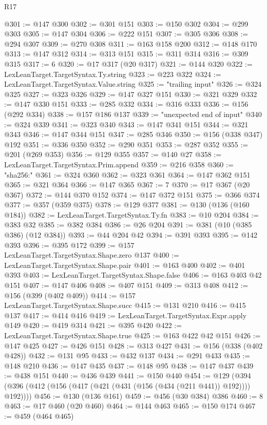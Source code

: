 \begin{lexlean}{R17}
\begin{coremodule}
@301 := @147 @300
@302 := @301 @151
@303 := @150 @302
@304 := @299 @303
@305 := @147 @304
@306 := @222 @151
@307 := @305 @306
@308 := @294 @307
@309 := @270 @308
@311 := @163 @158 @200
@312 := @148 @170
@313 := @147 @312
@314 := @313 @151
@315 := @311 @314
@316 := @309 @315
@317 := 6
@320 := @17 @317 (@20 @317)
@321 := @144 @320
@322 := LexLeanTarget.TargetSyntax.Ty.string
@323 := @223 @322
@324 := LexLeanTarget.TargetSyntax.Value.string
@325 := "trailing input"
@326 := @324 @325
@327 := @323 @326
@329 := @147 @327 @151
@330 := @321 @329
@332 := @147 @330 @151
@333 := @285 @332
@334 := @316 @333
@336 := @156 (@292 @334)
@338 := @157 @186 @137
@339 := "unexpected end of input"
@340 := @324 @339
@341 := @323 @340
@343 := @147 @341 @151
@344 := @321 @343
@346 := @147 @344 @151
@347 := @285 @346
@350 := @156 (@338 @347) @192
@351 := @336 @350
@352 := @290 @351
@353 := @287 @352
@355 := @201 (@269 @353)
@356 := @129 @355
@357 := @140 @27
@358 := LexLeanTarget.TargetSyntax.Prim.append
@359 := @216 @358
@360 := "sha256:"
@361 := @324 @360
@362 := @323 @361
@364 := @147 @362 @151
@365 := @321 @364
@366 := @147 @365
@367 := 7
@370 := @17 @367 (@20 @367)
@372 := @144 @370 @152
@374 := @147 @372 @151
@375 := @366 @374
@377 := @357 (@359 @375)
@378 := @129 @377
@381 := @130 (@136 (@160 @184))
@382 := LexLeanTarget.TargetSyntax.Ty.fn
@383 := @10 @204
@384 := @383 @32
@385 := @382 @384
@386 := @26 @204
@391 := @381 (@10 (@385 @386) (@12 @384))
@393 := @44 @204 @42
@394 := @391 @393
@395 := @142 @393
@396 := @395 @172
@399 := @157 LexLeanTarget.TargetSyntax.Shape.zero @137
@400 := LexLeanTarget.TargetSyntax.Shape.pair
@401 := @163 @400
@402 := @401 @393
@403 := LexLeanTarget.TargetSyntax.Shape.false
@406 := @163 @403 @42 @151
@407 := @147 @406
@408 := @407 @151
@409 := @313 @408
@412 := @156 (@399 (@402 @409))
@414 := @157 LexLeanTarget.TargetSyntax.Shape.succ
@415 := @131 @210
@416 := @415 @137
@417 := @414 @416
@419 := LexLeanTarget.TargetSyntax.Expr.apply @149
@420 := @419 @314
@421 := @395 @420
@422 := LexLeanTarget.TargetSyntax.Shape.true
@425 := @163 @422 @42 @151
@426 := @147 @425
@427 := @426 @151
@428 := @313 @427
@431 := @156 (@338 (@402 @428))
@432 := @131 @95
@433 := @432 @137
@434 := @291 @433
@435 := @148 @210
@436 := @147 @435
@437 := @148 @95
@438 := @147 @437
@439 := @438 @151
@440 := @436 @439
@441 := @150 @440
@454 := @129 (@394 (@396 (@412 (@156 (@417 (@421 (@431 (@156 (@434 (@211 @441)) @192)))) @192))))
@456 := @130 (@136 @161)
@459 := @456 (@30 @384) @386
@460 := 8
@463 := @17 @460 (@20 @460)
@464 := @144 @463
@465 := @150 @174
@467 := @459 (@464 @465)

\end{coremodule}
\end{lexlean}

